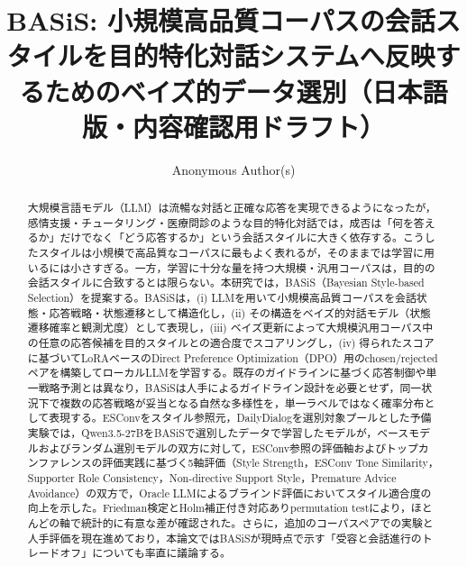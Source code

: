 \documentclass[manuscript,review,anonymous]{acmart}
\makeatletter
\newcommand{\ActivateCJKForPDFLaTeX}{%
  \CJKnospace
  \CJK@envStart{}{UTF8}{min}%
}
\makeatother
\begin{document}
\ActivateCJKForPDFLaTeX

\title{BASiS: 小規模高品質コーパスの会話スタイルを目的特化対話システムへ反映するためのベイズ的データ選別（日本語版・内容確認用ドラフト）}

\author{Anonymous Author(s)}
\renewcommand{\shortauthors}{Anonymous Author(s)}

\begin{abstract}
大規模言語モデル（LLM）は流暢な対話と正確な応答を実現できるようになったが，感情支援・チュータリング・医療問診のような目的特化対話では，成否は「何を答えるか」だけでなく「どう応答するか」という会話スタイルに大きく依存する。こうしたスタイルは小規模で高品質なコーパスに最もよく表れるが，そのままでは学習に用いるには小さすぎる。一方，学習に十分な量を持つ大規模・汎用コーパスは，目的の会話スタイルに合致するとは限らない。本研究では，BASiS（Bayesian Style-based Selection）を提案する。BASiSは，(i) LLMを用いて小規模高品質コーパスを会話状態・応答戦略・状態遷移として構造化し，(ii) その構造をベイズ的対話モデル（状態遷移確率と観測尤度）として表現し，(iii) ベイズ更新によって大規模汎用コーパス中の任意の応答候補を目的スタイルとの適合度でスコアリングし，(iv) 得られたスコアに基づいてLoRAベースのDirect Preference Optimization（DPO）用のchosen/rejectedペアを構築してローカルLLMを学習する。既存のガイドラインに基づく応答制御や単一戦略予測とは異なり，BASiSは人手によるガイドライン設計を必要とせず，同一状況下で複数の応答戦略が妥当となる自然な多様性を，単一ラベルではなく確率分布として表現する。ESConvをスタイル参照元，DailyDialogを選別対象プールとした予備実験では，Qwen3.5-27BをBASiSで選別したデータで学習したモデルが，ベースモデルおよびランダム選別モデルの双方に対して，ESConv参照の評価軸およびトップカンファレンスの評価実践に基づく5軸評価（Style Strength，ESConv Tone Similarity，Supporter Role Consistency，Non-directive Support Style，Premature Advice Avoidance）の双方で，Oracle LLMによるブラインド評価においてスタイル適合度の向上を示した。Friedman検定とHolm補正付き対応ありpermutation testにより，ほとんどの軸で統計的に有意な差が確認された。さらに，追加のコーパスペアでの実験と人手評価を現在進めており，本論文ではBASiSが現時点で示す「受容と会話進行のトレードオフ」についても率直に議論する。
\end{abstract}
\end{document}
